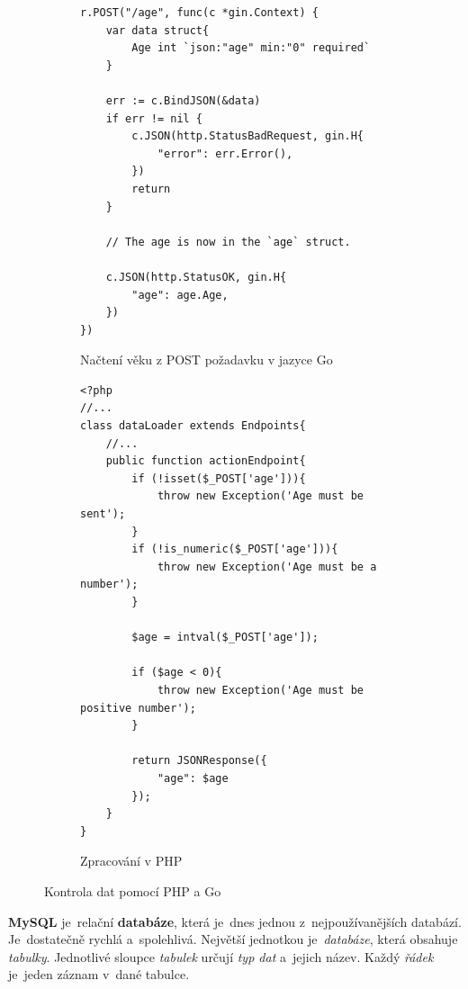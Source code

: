 \documentclass[11pt,a4paper]{report}
\begin{document}
            \begin{figure}
                \begin{subfigure}[b]{0.45\linewidth}
                    \begin{verbatim}
r.POST("/age", func(c *gin.Context) {
    var data struct{
        Age int `json:"age" min:"0" required`
    }

    err := c.BindJSON(&data)
    if err != nil {
        c.JSON(http.StatusBadRequest, gin.H{
            "error": err.Error(),
        })
        return
    }

    // The age is now in the `age` struct.

    c.JSON(http.StatusOK, gin.H{
        "age": age.Age,
    })
})
                    \end{verbatim}
                    \caption{Načtení věku z POST požadavku v jazyce Go}
                \end{subfigure}
                \hfill
                \begin{subfigure}[b]{0.45\linewidth}
                    \begin{verbatim}
<?php
//...
class dataLoader extends Endpoints{
    //...
    public function actionEndpoint{
        if (!isset($_POST['age'])){
            throw new Exception('Age must be sent');
        }
        if (!is_numeric($_POST['age'])){
            throw new Exception('Age must be a number');
        }

        $age = intval($_POST['age']);

        if ($age < 0){
            throw new Exception('Age must be positive number');
        }

        return JSONResponse({
            "age": $age
        });
    }
}

                    \end{verbatim}
                    \caption{Zpracování v PHP}
                \end{subfigure}
                \caption{Kontrola dat pomocí PHP a Go}
                \label{go:structuretags}
            \end{figure}
            
            \textbf{MySQL} je~relační \textbf{databáze}, která je~dnes jednou z~nejpoužívanějších databází. Je~dostatečně rychlá a~spolehlivá. Největší jednotkou je~\emph{databáze}, která obsahuje \emph{tabulky}. Jednotlivé sloupce \emph{tabulek} určují \emph{typ dat} a~jejich název. Každý \emph{řádek} je~jeden záznam v~dané tabulce.\cite{databases21}
            
\end{document}
